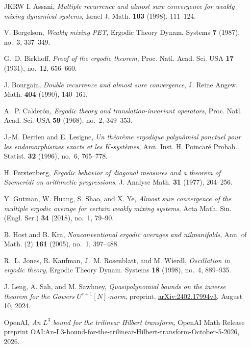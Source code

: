 \begin{thebibliography}{JKRW}
I. Assani, \emph{Multiple recurrence and almost sure convergence for
weakly mixing dynamical systems}, Israel J. Math. \textbf{103}
(1998), 111--124.

V. Bergelson, \emph{Weakly mixing PET}, Ergodic Theory Dynam. Systems
\textbf{7} (1987), no.~3, 337--349.

G.~D. Birkhoff, \emph{Proof of the ergodic theorem}, Proc. Natl. Acad.
Sci. USA \textbf{17} (1931), no.~12, 656--660.

J. Bourgain, \emph{Double recurrence and almost sure convergence},
J. Reine Angew. Math. \textbf{404} (1990), 140--161.

A.~P. Calder\'on, \emph{Ergodic theory and translation-invariant
operators}, Proc. Natl. Acad. Sci. USA \textbf{59} (1968), no.~2,
349--353.

J.-M. Derrien and E. Lesigne, \emph{Un th\'eor\`eme ergodique
polyn\^omial ponctuel pour les endomorphismes exacts et les
$K$-syst\`emes}, Ann. Inst. H. Poincar\'e Probab. Statist.
\textbf{32} (1996), no.~6, 765--778.

H. Furstenberg, \emph{Ergodic behavior of diagonal measures and a
theorem of Szemer\'edi on arithmetic progressions}, J. Analyse Math.
\textbf{31} (1977), 204--256.

Y. Gutman, W. Huang, S. Shao, and X. Ye,
\emph{Almost sure convergence of the multiple ergodic average for
certain weakly mixing systems}, Acta Math. Sin. (Engl. Ser.)
\textbf{34} (2018), no.~1, 79--90.

B. Host and B. Kra, \emph{Nonconventional ergodic averages and
nilmanifolds}, Ann. of Math. (2) \textbf{161} (2005), no.~1, 397--488.

R.~L. Jones, R. Kaufman, J.~M. Rosenblatt, and M. Wierdl,
\emph{Oscillation in ergodic theory}, Ergodic Theory Dynam. Systems
\textbf{18} (1998), no.~4, 889--935.

J. Leng, A. Sah, and M. Sawhney, \emph{Quasipolynomial bounds on the
inverse theorem for the Gowers $U^{s+1}[N]$-norm}, preprint,
\href{https://arxiv.org/abs/2402.17994v3}{arXiv:2402.17994v3},
August 10, 2024.

OpenAI, \emph{An $L^3$ bound for the trilinear Hilbert transform},
OpenAI Math Release preprint
\href{https://github.com/openai/math/blob/main/preprints/An-L3-bound-for-the-trilinear-Hilbert-transform-October-5-2026/paper.pdf}{OAI:An-L3-bound-for-the-trilinear-Hilbert-transform-October-5-2026},
2026.


\end{thebibliography}
